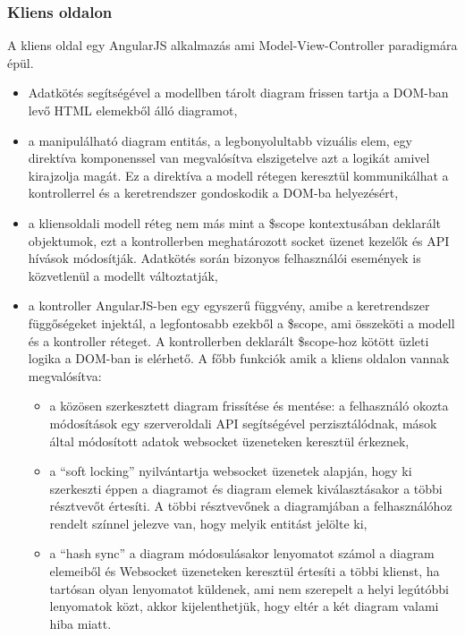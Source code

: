 \subsubsection{Kliens oldalon}

A kliens oldal egy AngularJS alkalmazás ami Model-View-Controller paradigmára épül.  


\begin{itemize}
\item Adatkötés segítségével a modellben tárolt diagram frissen tartja a DOM-ban levő HTML elemekből álló diagramot, 
\item a manipulálható diagram entitás, a legbonyolultabb vizuális elem, egy direktíva komponenssel van megvalósítva elszigetelve azt a logikát amivel kirajzolja magát. Ez a direktíva a modell rétegen keresztül kommunikálhat a kontrollerrel és a keretrendszer gondoskodik a DOM-ba helyezésért,
\item a kliensoldali modell réteg nem más mint a \$scope kontextusában deklarált objektumok, ezt a kontrollerben meghatározott socket üzenet kezelők és API hívások módosítják. Adatkötés során bizonyos felhasználói események is közvetlenül a modellt változtatják,
\item a kontroller AngularJS-ben egy egyszerű függvény, amibe a keretrendszer függőségeket injektál, a legfontosabb ezekből a \$scope, ami összeköti a modell és a kontroller réteget. A kontrollerben deklarált \$scope-hoz kötött üzleti logika a DOM-ban is elérhető. A főbb funkciók amik a kliens oldalon vannak megvalósítva:
    \begin{itemize} 
    \item a közösen szerkesztett diagram frissítése és mentése: a felhasználó okozta módosítások egy szerveroldali API segítségével perzisztálódnak, mások által módosított adatok websocket üzeneteken keresztül érkeznek, 
    \item a ``soft locking'' nyilvántartja websocket üzenetek alapján, hogy ki szerkeszti éppen a diagramot és diagram elemek kiválasztásakor a többi résztvevőt értesíti. A többi résztvevőnek a diagramjában a felhasználóhoz rendelt színnel jelezve van, hogy melyik entitást jelölte ki,
    \item a ``hash sync'' a diagram módosulásakor lenyomatot számol a diagram elemeiből és Websocket üzeneteken keresztül értesíti a többi klienst, ha tartósan olyan lenyomatot küldenek, ami nem szerepelt a helyi legútóbbi lenyomatok közt, akkor kijelenthetjük, hogy eltér a két diagram valami hiba miatt. 
    \end{itemize}
\end{itemize}

